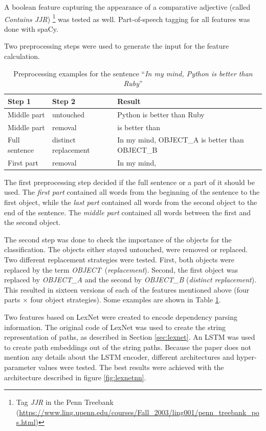 A boolean feature capturing the appearance of a comparative adjective (called \emph{Contains JJR}) \footnote{Tag \emph{JJR} in the Penn Treebank (\url{https://www.ling.upenn.edu/courses/Fall\_2003/ling001/penn\_treebank\_pos.html})} was tested as well. Part-of-speech tagging for all features was done with spaCy.\newline

Two preprocessing steps were used to generate the input for the feature calculation.
\begin{table}[ht]
\centering

\caption{Preprocessing examples for the sentence \enquote{\emph{In my mind, Python is better than Ruby}}}
\label{preprocessing_example}
\begin{tabularx}{\linewidth}{llX}
\toprule
Step 1 & Step 2 & Result \\ \midrule
Middle part & untouched & Python is better than Ruby \\
Middle part & removal & is better than \\
Full sentence & distinct replacement &In my mind, OBJECT\_A is better than OBJECT\_B \\
First part & removal & In my mind, \\
\bottomrule
\end{tabularx}

\end{table}

The first preprocessing step decided if the full sentence or a part of it should be used. The \emph{first part} contained all words from the beginning of the sentence to the first object, while the \emph{last part} contained all words from the second object to the end of the sentence. The \emph{middle part} contained all words between the first and the second object.

The second step was done to check the importance of the objects for the classification. The objects either stayed untouched, were removed or replaced. Two different replacement strategies were tested. First, both objects were replaced by the term \mbox{\emph{OBJECT} (\emph{replacement})}. Second, the first object was replaced by \emph{OBJECT\_A} and the second by \emph{OBJECT\_B} (\emph{distinct replacement}). This resulted in sixteen versions of each of the features mentioned above (four parts $\times$ four object strategies). Some examples are shown in Table \ref{preprocessing_example}.\newline


\label{sec:lexnet_feat_desc}
Two features based on LexNet were created to encode dependency parsing information. The original code of LexNet was used to create the string representation of paths, as described in Section \ref{sec:lexnet}. An LSTM was used to create path embeddings out of the string paths. Because the paper does not mention any details about the LSTM encoder, different architectures and hyper-parameter values were tested. The best results were achieved with the architecture described in figure \ref{fig:lexnetnn}.

